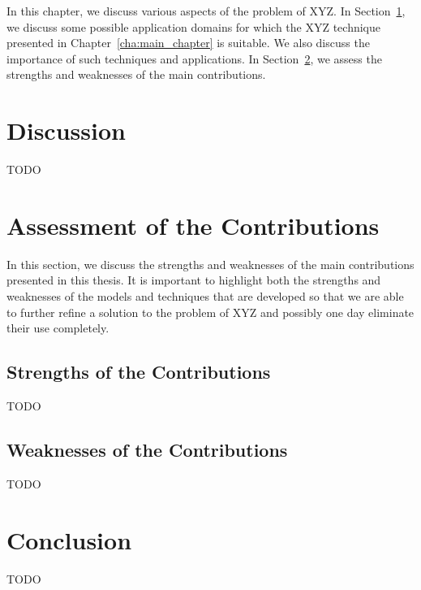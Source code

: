 In this chapter, we discuss various aspects of the problem of XYZ. In Section~\ref{sec:discussion}, we discuss some possible application domains for which the XYZ technique presented in Chapter~\ref{cha:main_chapter} is suitable. We also discuss the importance of such techniques and applications. In Section~\ref{sec:assessment_of_the_contributions}, we assess the strengths and weaknesses of the main contributions. 

\section{Discussion}
\label{sec:discussion}

TODO


\section{Assessment of the Contributions}
\label{sec:assessment_of_the_contributions}

In this section, we discuss the strengths and weaknesses of the main contributions presented in this thesis. It is important to highlight both the strengths and weaknesses of the models and techniques that are developed so that we are able to further refine a solution to the problem of XYZ and possibly one day eliminate their use completely.

\subsection{Strengths of the Contributions}
\label{sub:strengths_of_the_contributions}

TODO



\subsection{Weaknesses of the Contributions}
\label{sub:weaknesses_of_the_contributions}

TODO



\section{Conclusion}
\label{sec:discussion_conclusion}

TODO

